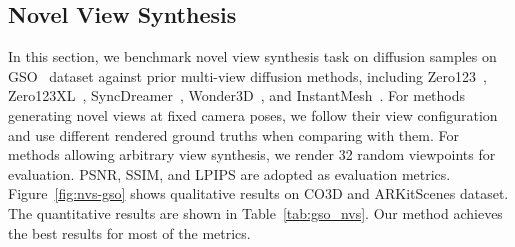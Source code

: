 \begin{table}[t]
\vspace{-3mm}
\caption{Quantitative evaluation of monocular metric depth prediction tasks on DTU. The best results are in \textbf{bold}. }
\vspace{-6mm}
\label{tab:mono_depth}
\end{table}

\subsection{Novel View Synthesis}
In this section, we benchmark novel view synthesis task on diffusion samples on GSO~\cite{downs2022google} dataset against prior multi-view diffusion methods, including Zero123~\cite{liu2023zero}, Zero123XL~\cite{deitke2024objaverse}, SyncDreamer~\cite{liu2023syncdreamer}, Wonder3D~\cite{long2023wonder3d}, and InstantMesh~\cite{xu2024instantmesh}. 
For methods generating novel views at fixed camera poses, we follow their view configuration and use different rendered ground truths when comparing with them. 
For methods allowing arbitrary view synthesis, we render 32 random viewpoints for evaluation. 
PSNR, SSIM, and LPIPS are adopted as evaluation metrics. Figure~\ref{fig:nvs-gso} shows qualitative results on CO3D and ARKitScenes dataset. The quantitative results are shown in Table~\ref{tab:gso_nvs}. Our method achieves the best results for most of the metrics. 



